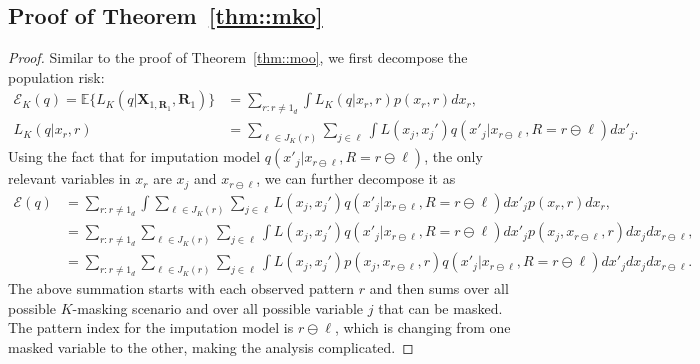 \documentclass[aos, preprint]{imsart}
\theoremstyle{plain}
\theoremstyle{definition}
\newcommand{\E}{\mbox{$\mathbb{E}$}}
\newcommand{\bX}{\mathbf{X}}
\newcommand{\bR}{\mathbf{R}}
\begin{document}
\begin{appendix}
\subsection{Proof of Theorem~\ref{thm::mko}}

\begin{proof}
Similar to the proof of Theorem~\ref{thm::moo}, we first decompose the population risk:
\begin{align*}
\mathcal{E}_K(q) = \E\{L_K(q| \bX_{1,\bR_1},\bR_1)\} &= \sum_{r:r\neq 1_d}\int L_K(q|x_{r} , r) p(x_r,r)dx_r,\\
L_K(q|x_{r} , r) & = \sum_{\ell \in J_K(r)}\sum_{j \in \ell} \int L(x_j, x_j') q(x'_j|x_{r\ominus \ell},R=r\ominus \ell)dx'_j.
\end{align*}
Using the fact that for imputation model $q(x'_j|x_{r\ominus \ell},R=r\ominus \ell)$,
the only relevant variables in $x_r$ are $x_j$ and $x_{r\ominus \ell}$,
we can further decompose it as 
\begin{equation}
\begin{aligned}
\mathcal{E}(q) & = 
 \sum_{r:r\neq 1_d}\int\sum_{\ell \in J_K(r)}\sum_{j \in \ell} L(x_j, x_j') q(x'_j|x_{r\ominus \ell},R=r\ominus \ell)dx'_j p(x_r,r)dx_r,\\
&=  \sum_{r:r\neq 1_d} \sum_{\ell \in J_K(r)}\sum_{j \in \ell} \int L(x_j, x_j') q(x'_j|x_{r\ominus \ell},R=r\ominus \ell)dx'_j p(x_j, x_{r\ominus \ell},r)dx_j dx_{r\ominus \ell},\\
&=  \sum_{r:r\neq 1_d} \sum_{\ell \in J_K(r)}\sum_{j \in \ell} \int L(x_j, x_j') p(x_j, x_{r\ominus \ell},r) q(x'_j|x_{r\ominus \ell},R=r\ominus \ell)dx'_j dx_j dx_{r\ominus \ell}.
\end{aligned}
\label{eq::mko::pf1}
\end{equation}
The above summation starts with each observed pattern $r$ and then sums over all possible $K$-masking scenario
and over all possible variable $j$ that can be masked.
The pattern index for the imputation model is $r\ominus \ell$, which is changing from one masked variable to the other, making
the analysis complicated.


\end{proof}
\end{appendix}
\end{document}
